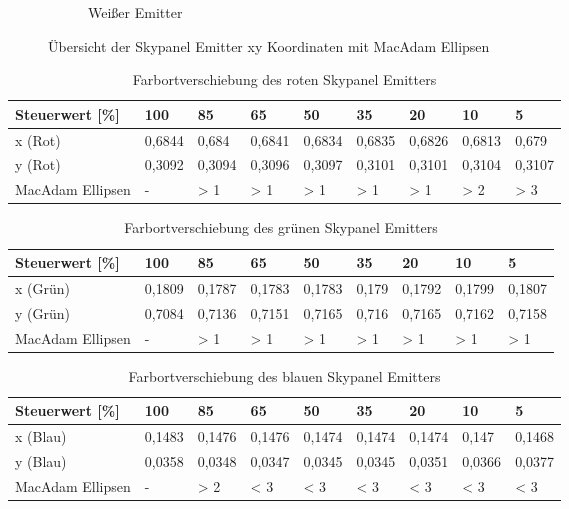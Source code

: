 \documentclass[11pt]{scrartcl}
\begin{document}
\begin{figure}[H]
\begin{subfigure}[b]{.49\textwidth}
        \caption{Weißer Emitter}
    \end{subfigure}
    \caption{Übersicht der Skypanel Emitter xy Koordinaten mit MacAdam Ellipsen}
\end{figure}
\noindent
\begin{table}[H]
    \begin{tabularx}{\textwidth}{|l|X|X|X|X|X|X|X|X|}
        \hline
        Steuerwert [\%]  & 100    & 85     & 65     & 50     & 35     & 20     & 10     & 5      \\\hline
        x (Rot)          & 0,6844 & 0,684  & 0,6841 & 0,6834 & 0,6835 & 0,6826 & 0,6813 & 0,679  \\\hline
        y (Rot)          & 0,3092 & 0,3094 & 0,3096 & 0,3097 & 0,3101 & 0,3101 & 0,3104 & 0,3107 \\\hline
        MacAdam Ellipsen & -      & > 1    & > 1    & > 1    & > 1    & > 1    & > 2    & > 3    \\\hline
    \end{tabularx}
    \caption{Farbortverschiebung des roten Skypanel Emitters}
\end{table}
\noindent
\begin{table}[H]
    \begin{tabularx}{\textwidth}{|l|X|X|X|X|X|X|X|X|}
        \hline
        Steuerwert [\%]  & 100    & 85     & 65     & 50     & 35     & 20     & 10     & 5      \\\hline
        x (Grün)         & 0,1809 & 0,1787 & 0,1783 & 0,1783 & 0,179  & 0,1792 & 0,1799 & 0,1807 \\\hline
        y (Grün)         & 0,7084 & 0,7136 & 0,7151 & 0,7165 & 0,716  & 0,7165 & 0,7162 & 0,7158 \\\hline
        MacAdam Ellipsen & -      & > 1    & > 1    & > 1    & > 1    & > 1    & > 1    & > 1    \\\hline
    \end{tabularx}
    \caption{Farbortverschiebung des grünen Skypanel Emitters}
\end{table}
\noindent
\begin{table}[H]
    \begin{tabularx}{\textwidth}{|l|X|X|X|X|X|X|X|X|}
        \hline
        Steuerwert [\%]  & 100    & 85     & 65     & 50     & 35     & 20     & 10     & 5      \\\hline
        x (Blau)         & 0,1483 & 0,1476 & 0,1476 & 0,1474 & 0,1474 & 0,1474 & 0,147  & 0,1468 \\\hline
        y (Blau)         & 0,0358 & 0,0348 & 0,0347 & 0,0345 & 0,0345 & 0,0351 & 0,0366 & 0,0377 \\\hline
        MacAdam Ellipsen & -      & > 2    & < 3    & < 3    & < 3    & < 3    & < 3    & < 3    \\\hline
    \end{tabularx}
    \caption{Farbortverschiebung des blauen Skypanel Emitters}
\end{table}
\end{document}
